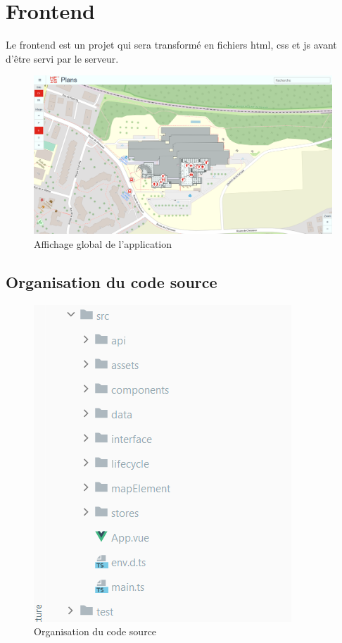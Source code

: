 \documentclass[
    iai, %
    il, %
]{heig-tb}
\begin{document}
\section{Frontend}

Le frontend est un projet qui sera transformé en fichiers \gls{html}, \gls{css} et \gls{js} avant d'être servi par le serveur.

\begin{figure}[h]
    \centering
    \includegraphics[scale=0.3]{frontend-global.png}
    \caption{Affichage global de l'application}
\end{figure}

\subsection{Organisation du code source}

\begin{figure}[h]
    \centering
    \includegraphics[scale=0.7]{frontend-source-organisation.png}
    \caption{Organisation du code source}
    \label{fig:fichier-source}
\end{figure}
\end{document}
